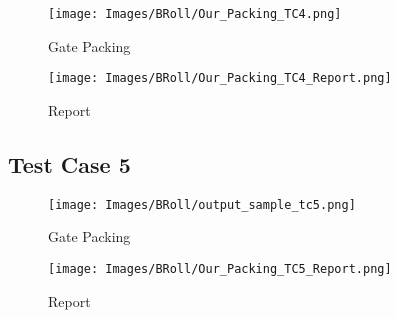 \documentclass[12pt, a4paper,openany]{article}
\begin{document}
\begin{figure}[ht]
    \centering
    \begin{minipage}{.6\textwidth}
          \centering
          \texttt{[image: Images/BRoll/Our\_Packing\_TC4.png]}
          \label{fig:tc-4}
          \caption{Gate Packing }
     
          \texttt{[image: Images/BRoll/Our\_Packing\_TC4\_Report.png]}
          \label{fig:tcr-4}
          \caption{Report}
          \centering 
      \end{minipage}
    \end{figure}

\newpage
\subsection{Test Case 5}
\begin{figure}[ht]
    \centering
    \begin{minipage}{.7\textwidth}
          \centering
          \texttt{[image: Images/BRoll/output\_sample\_tc5.png]}
          \label{fig:tc-5}
          \caption{Gate Packing }
      
          \texttt{[image: Images/BRoll/Our\_Packing\_TC5\_Report.png]}
          \label{fig:tcr-5}
          \caption{Report}
          \centering 
      \end{minipage}
\end{figure}
\end{document}
